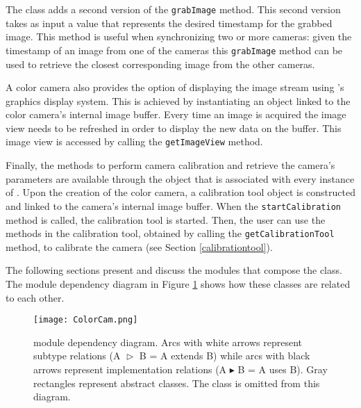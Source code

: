 The \ColorCam{} class adds a second version of the \texttt{grab\-Im\-age} method. This second version takes
as input a value that represents the desired timestamp for the grabbed image. This method is 
useful when synchronizing two or more cameras: given the timestamp of an image from one of the cameras
this \texttt{grab\-Im\-age} method can be used to retrieve the closest corresponding image from the other
cameras.  

A color camera also provides the option of displaying the image stream using \RD{}'s graphics display system.
This is achieved by instantiating an \ImageView{} object linked to the color camera's internal image buffer. 
Every time an image is acquired the image view needs to be refreshed in order to display the new data on the 
buffer. This image view is accessed by calling the \texttt{get\-Im\-age\-View} method.

Finally, the methods to perform camera calibration and retrieve the camera's parameters are available 
through the \CalibrationTool{} object that is associated with every instance of \ColorCam{}. Upon the creation
of the color camera, a calibration tool object is constructed and linked to the camera's internal image buffer. 
When the \texttt{start\-Cal\-i\-bra\-tion} method is called, the calibration tool is started. Then, the user can
use the methods in the calibration tool, obtained by calling the \texttt{get\-Cal\-i\-bra\-tion\-Tool} method, to 
calibrate the camera (see Section \ref{calibrationtool}). 

The following sections present and discuss the modules that compose the \ColorCam{} class. The 
module dependency diagram in Figure \ref{colorcammoduledependency} shows how these classes 
are related to each other. 

\begin{figure}[t]
\begin{center}
\texttt{[image: ColorCam.png]}
%
\caption[\ColorCam{}'s module dependency diagram]{\ColorCam{} module dependency diagram. Arcs with 
white arrows represent subtype relations (A $\vartriangleright$ B = A extends B) while arcs with black arrows 
represent implementation relations (A $\blacktriangleright$ B = A uses B). Gray rectangles represent abstract 
classes. The \ImageBuffer{} class is omitted from this diagram.}
\label{colorcammoduledependency}
\end{center}
\end{figure}


